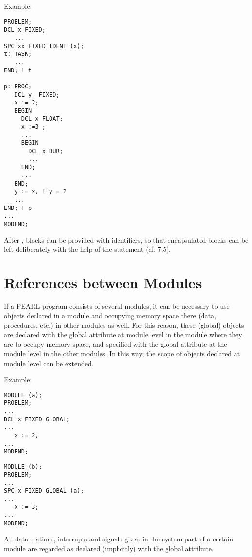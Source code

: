 Example:

\begin{lstlisting}
PROBLEM;
DCL x FIXED;
   ...
SPC xx FIXED IDENT (x);
t: TASK;
   ...
END; ! t

p: PROC;
   DCL y  FIXED;
   x := 2;
   BEGIN
     DCL x FLOAT;
     x :=3 ;
     ...
     BEGIN
       DCL x DUR;
       ...
     END;
     ...
   END;
   y := x; ! y = 2
   ...
END; ! p
...
MODEND;
\end{lstlisting}

After , blocks can be provided with identifiers, so that encapsulated
blocks can be left deliberately with the help of the  statement
(cf. 7.5).

\section{References between Modules}  %
\label{sec_references_module}

If a PEARL program consists of several modules, it can be necessary to
use objects declared in a module and occupying memory space there (data,
procedures, etc.) in other modules as well. For this reason, these
(global) objects are declared with the global attribute at module level
in the module where they are to occupy memory space, and specified with
the global attribute at the module level in the other modules. In this
way, the scope of objects declared at module level can be extended.

Example:
\begin{multicols}{2}
\begin{lstlisting}
MODULE (a);
PROBLEM;  
...      
DCL x FIXED GLOBAL;
...              
   x := 2;      
...           
MODEND;     
\end{lstlisting}
\columnbreak
\begin{lstlisting}
MODULE (b); 
PROBLEM;
...
SPC x FIXED GLOBAL (a);
...                   
   x := 3;
... 
MODEND;
\end{lstlisting}
\end{multicols}

All data stations, interrupts and signals given in the system part of a
certain module are regarded as declared (implicitly) with the global
attribute.

